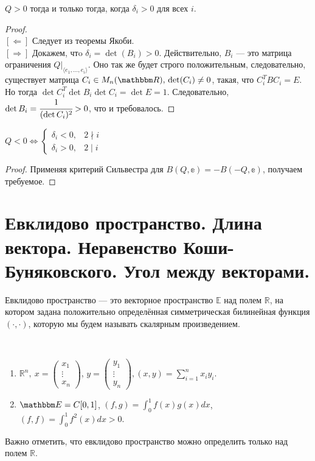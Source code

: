 \begin{Theorem}
	$Q > 0$ тогда и только тогда, когда $\delta_i > 0$  для всех $i$.
\end{Theorem}
\begin{proof}\ \\
	$[\Leftarrow]$ Следует из теоремы Якоби. \\
	$[\Rightarrow]$ Докажем, чтo $\delta_i = \det(B_i) > 0$. Действительно, $B_i$ --- это матрица ограничения $Q\bigr|_{\langle e_1, \ldots, e_i\rangle}$. Оно так же будет строго положительным, следовательно,  существует матрица $C_i \in M_n(\mathbb{R}),\\ \det(C_i)\neq 0$, такая, что $C_i^TBC_i = E$. Но тогда
	$\det C^T_i\det B_i \det C_i = \det E = 1$. Следовательно, $\det B_i = \cfrac{1}{(\det C_i)^2} > 0$, что и требовалось.
\end{proof}
\begin{Theorem}
	 $Q < 0 \Leftrightarrow \begin{cases}
		\delta_i < 0, & 2 \nmid i \\
		\delta_i > 0, & 2 \mid i
	\end{cases}$
\end{Theorem}
\begin{proof}
	Применяя критерий Сильвестра для $B(Q, \mathbb{e}) = - B(-Q, \mathbb{e})$, получаем требуемое.
\end{proof}

\section{Евклидово пространство. Длина вектора. Неравенство Коши-Буняковского. Угол между векторами.}

\begin{Def}
	Евклидово пространство --- это векторное пространство $\mathbb{E}$ над полем $\mathbb{R}$, на котором задана положительно определённая симметрическая билинейная функция $(\cdot, \cdot)$, которую мы будем называть скалярным произведением.
\end{Def}
\begin{Examples}\
\begin{enumerate}
\item	$\mathbb{R}^n,\ x = \begin{pmatrix}x_1\\ \vdots\\ x_n\end{pmatrix}$, $y = \begin{pmatrix}y_1\\ \vdots\\ y_n\end{pmatrix}, 
		(x,y) = \sum\limits_{i = 1}^n x_iy_i$.
\item $\E = C[0, 1]$, $(f, g) = \int_{0}^{1}f(x)g(x)dx$, $(f, f) = \int_{0}^{1}f^2(x)dx > 0$.
\end{enumerate}
\end{Examples}
\begin{Comment}
	Важно отметить, что евклидово пространство можно определить только над полем $\mathbb{R}$.
\end{Comment}

